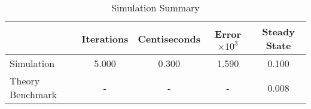 \begin{table}[htb]
\centering
\caption{Simulation Summary}
\label{table:psCp2:tab:sim2b}
\begin{tabular}{lcccc}
\hline
 & Iterations & Centiseconds & Error$\times 10^3$ & Steady State \\
\hline\hline
Simulation & 5.000 & 0.300 & 1.590 & 0.100 \\
Theory Benchmark & - & - & - & 0.008 \\
\hline
\end{tabular}
\end{table}
